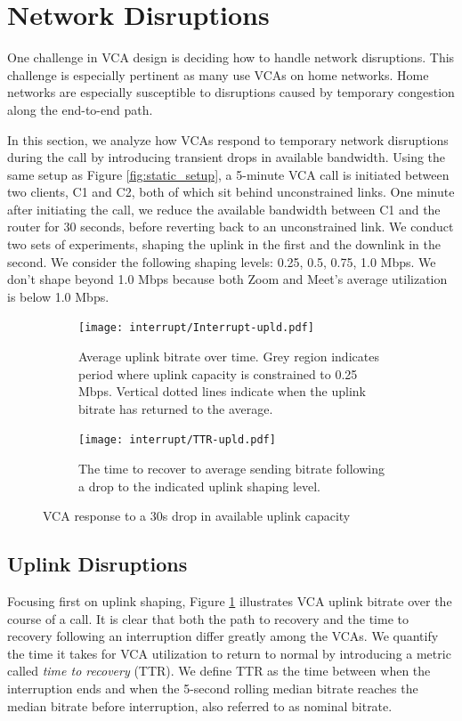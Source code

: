 

\section{Network Disruptions}
\label{sec:interruption}
One challenge in VCA design is deciding how to handle network disruptions. This challenge is especially pertinent as many use VCAs on home networks. Home networks are especially susceptible to disruptions caused by temporary congestion along the end-to-end path.

In this section, we analyze how VCAs respond to temporary network disruptions during the call by introducing transient drops in available bandwidth. Using the same setup as Figure \ref{fig:static_setup}, a 5-minute VCA call is initiated between two clients, C1 and C2, both of which sit behind unconstrained links. One minute after initiating the call, we reduce the available bandwidth between C1 and the router for 30 seconds, before reverting back to an unconstrained link. We conduct two sets of experiments, shaping the uplink in the first and the downlink in the second. We consider the following shaping levels: {0.25, 0.5, 0.75, 1.0} Mbps. We don't shape beyond 1.0 Mbps because both Zoom and Meet's average utilization is below 1.0 Mbps.

\begin{figure}[t!]
\centering
\begin{subfigure}[t]{.5\textwidth}
    \centering
    \texttt{[image: interrupt/Interrupt-upld.pdf]}
    \caption{Average uplink bitrate over time. Grey region indicates period where uplink capacity is constrained to 0.25 Mbps. Vertical dotted lines indicate when the uplink bitrate has returned to the average.}
    \label{fig:ts_upld}
\end{subfigure}\hfill
\begin{subfigure}[t]{.5\textwidth}
      \centering
    \texttt{[image: interrupt/TTR-upld.pdf]}
    \caption{The time to recover to average sending bitrate following a drop to the indicated uplink shaping level.}
    \label{fig:TTR_upld}
\end{subfigure}
\caption{VCA response to a 30s drop in available uplink capacity}
\label{fig:interrupt-upld}
\end{figure}

\subsection{Uplink Disruptions}
Focusing first on uplink shaping, Figure \ref{fig:ts_upld} illustrates VCA uplink bitrate over the course of a call. It is clear that both the path to recovery and the time to recovery following an interruption differ greatly among the VCAs. We quantify the time it takes for VCA utilization to return to normal by introducing a metric called \textit{time to recovery} (TTR). We define TTR as the time between when the interruption ends and when the 5-second rolling median bitrate reaches the median bitrate before interruption, also referred to as nominal bitrate. %

